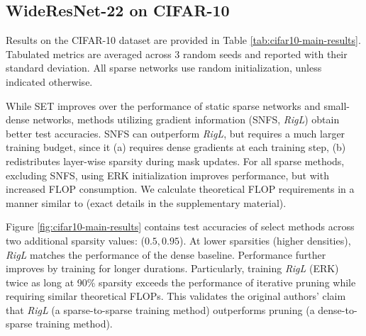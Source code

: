 \subsection{WideResNet-22 on CIFAR-10}\label{cifar-10-results}


   
Results on the CIFAR-10 dataset are provided in Table \ref{tab:cifar10-main-results}. Tabulated metrics are averaged across 3 random seeds and reported with their standard deviation. All sparse networks use random initialization, unless indicated otherwise.

While SET improves over the performance of static sparse networks and small-dense networks, methods utilizing gradient information (SNFS, \textit{RigL}) obtain better test accuracies. SNFS can outperform \textit{RigL}, but requires a much larger training budget, since it (a) requires dense gradients at each training step, (b) redistributes layer-wise sparsity during mask updates. For all sparse methods, excluding SNFS, using ERK initialization improves performance, but with increased FLOP consumption. We calculate theoretical FLOP requirements in a manner similar to \citet{rigl} (exact details in the supplementary material). 

Figure \ref{fig:cifar10-main-results} contains test accuracies of select methods across two additional sparsity values: ($0.5, 0.95$). At lower sparsities (higher densities), \textit{RigL} matches the performance of the dense baseline. Performance further improves by training for longer durations. Particularly, training \textit{RigL} (ERK) twice as long at 90\% sparsity exceeds the performance of iterative pruning while requiring similar theoretical FLOPs. This validates the original authors' claim that \textit{RigL} (a sparse-to-sparse training method) outperforms pruning (a dense-to-sparse training method). 

